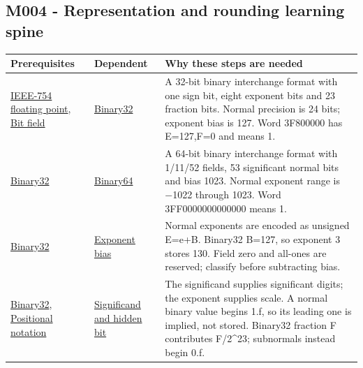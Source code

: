 \subsection{M004 - Representation and rounding learning spine}\label{appendix-4ad47bdd269a-m004---representation-and-rounding-learning-spine}

{\def\LTcaptype{none} %
\begin{longtable}[]{@{}
  >{\raggedright\arraybackslash}p{}
  >{\raggedright\arraybackslash}p{}
  >{\raggedright\arraybackslash}p{}@{}}
\toprule\noalign{}
\begin{minipage}[b]{\linewidth}\raggedright
Prerequisites
\end{minipage} & \begin{minipage}[b]{\linewidth}\raggedright
Dependent
\end{minipage} & \begin{minipage}[b]{\linewidth}\raggedright
Why these steps are needed
\end{minipage} \\
\midrule\noalign{}
\endhead
\bottomrule\noalign{}
\endlastfoot
\hyperref[appendix-343615f49ddf]{IEEE-754 floating point}, \hyperref[appendix-ac697f5c66e8]{Bit field} & \hyperref[appendix-5057f9ad327f]{Binary32} & A 32-bit binary interchange format with one sign bit, eight exponent bits and 23 fraction bits. Normal precision is 24 bits; exponent bias is 127. Word 3F800000 has E=127,F=0 and means 1. \\
\hyperref[appendix-5057f9ad327f]{Binary32} & \hyperref[appendix-5078dfab64e6]{Binary64} & A 64-bit binary interchange format with 1/11/52 fields, 53 significant normal bits and bias 1023. Normal exponent range is −1022 through 1023. Word 3FF0000000000000 means 1. \\
\hyperref[appendix-5057f9ad327f]{Binary32} & \hyperref[appendix-2fae058c82e1]{Exponent bias} & Normal exponents are encoded as unsigned E=e+B. Binary32 B=127, so exponent 3 stores 130. Field zero and all-ones are reserved; classify before subtracting bias. \\
\hyperref[appendix-5057f9ad327f]{Binary32}, \hyperref[appendix-83c3f28f7bda]{Positional notation} & \hyperref[appendix-a24fd710cf67]{Significand and hidden bit} & The significand supplies significant digits; the exponent supplies scale. A normal binary value begins 1.f, so its leading one is implied, not stored. Binary32 fraction F contributes F/2\^{}23; subnormals instead begin 0.f. \\

\end{longtable}}
